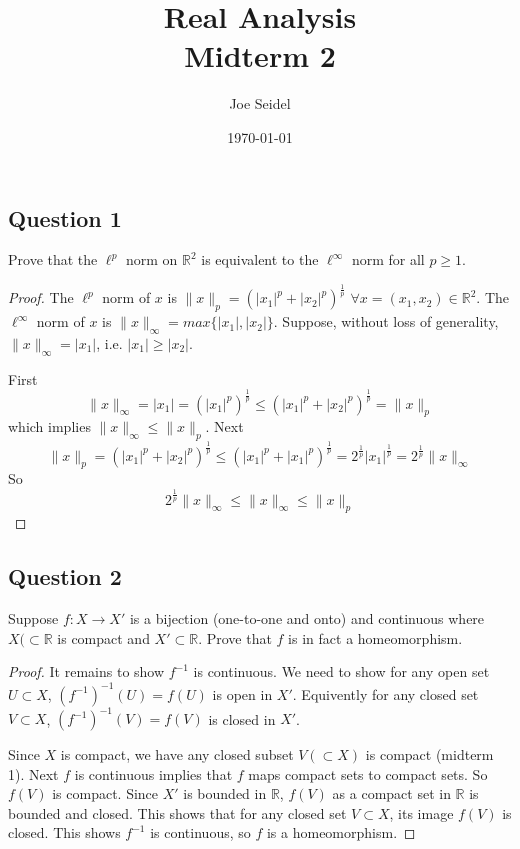 \documentclass{tufte-book}
\title{Real Analysis\\Midterm 2}
\author{Joe Seidel}
\date{\today}
\theoremstyle{mytheoremstyle}
\theoremstyle{mylemstyle}
\theoremstyle{mydefstyle}
\begin{document}
\maketitle
{}
\newpage
{}

\subsection{Question 1}
Prove that the $\ell^p$ norm on $\mathbb{R}^2$ is equivalent to the $\ell^\infty$ norm for all $p \geq 1$.

\begin{proof}
The $\ell^p$ norm of $x$ is $\|x\|_p = (|x_1|^p + |x_2|^p)^{\frac{1}{p}}$ $\forall x = (x_1,x_2) \in \mathbb{R}^2$.  The $\ell^\infty$ norm of $x$ is $\|x\|_\infty = max\{|x_1|, |x_2|\}$.  Suppose, without loss of generality, $\|x\|_\infty = |x_1|$, i.e. $|x_1| \geq |x_2|$.

First 
\[ \|x\|_\infty = |x_1| = (|x_1|^p)^\frac{1}{p} \leq (|x_1|^p + |x_2|^p)^\frac{1}{p} = \|x\|_p \]
which implies $\|x\|_\infty \leq \|x\|_p$.
Next
\[ \|x\|_p = (|x_1|^p + |x_2|^p)^{\frac{1}{p}} \leq (|x_1|^p + |x_1|^p)^\frac{1}{p} = 2^\frac{1}{p}|x_1|^\frac{1}{p} = 2^\frac{1}{p}\|x\|_\infty \]
So
\[  2^\frac{1}{p}\|x\|_\infty \leq \|x\|_\infty \leq \|x\|_p \]

\end{proof}

\subsection{Question 2}
Suppose $f: X \to X'$ is a bijection (one-to-one and onto) and continuous where $X(\subset \mathbb{R}$ is compact and $X' \subset \mathbb{R}$.  Prove that $f$ is in fact a homeomorphism.

\begin{proof}
It remains to show $f^{-1}$ is continuous.  We need to show for any open set $U \subset X$, $(f^{-1})^{-1}(U) = f(U)$ is open in $X'$.  Equivently for any closed set $V \subset X$, $(f^{-1})^{-1}(V) = f(V)$  is closed in $X'$.

Since $X$ is compact, we have any closed subset $V(\subset X)$ is compact (midterm 1).  Next $f$ is continuous implies that $f$ maps compact sets to compact sets. So $f(V)$ is compact.  Since $X'$ is bounded in $\mathbb{R}$, $f(V)$ as a compact set in $\mathbb{R}$ is bounded and closed.  This shows that for any closed set $V \subset X$, its image $f(V)$ is closed.  This shows $f^{-1}$ is continuous, so $f$ is a homeomorphism.
\end{proof}
\end{document}
